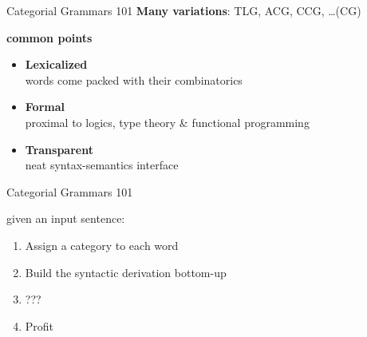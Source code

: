 \documentclass{beamer}
\begin{document}
\begin{frame}{Categorial Grammars 101}
    \smaller
    \textbf{Many variations}: TLG, ACG, CCG, \dots ({\text{*}}CG)\\
    \hfill
    
    {
        \begin{block}{\smaller \textbf{common points}}
            \begin{itemize}
                \item \textbf{Lexicalized}\\
                words come packed with their combinatorics 
                \item \textbf{Formal}\\
                proximal to logics, type theory \& functional programming
                \item \textbf{Transparent}\\
                neat syntax-semantics interface
            \end{itemize}
        \end{block}
    }
\end{frame}

\begin{frame}{Categorial Grammars 101}
    \smaller
    
    \begin{block}{}
    given an input sentence:
        \begin{enumerate}
            \item Assign a category to each word
            \item Build the syntactic derivation bottom-up
            \item ???
            \item Profit
        \end{enumerate}
    \end{block}\vfill
    
    \noindent
    \hfill{}
    
\end{frame}
\end{document}
